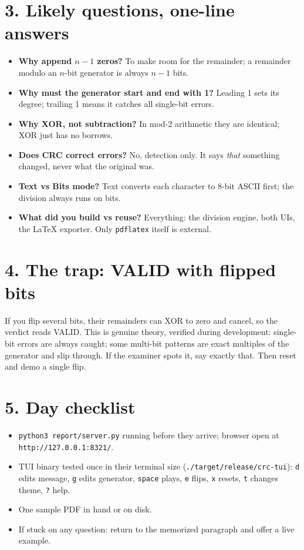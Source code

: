 \documentclass[11pt,a4paper]{article}
\begin{document}
\section*{3. Likely questions, one-line answers}

\begin{itemize}[leftmargin=1.5em]
  \item \textbf{Why append $n-1$ zeros?} To make room for the remainder;
  a remainder modulo an $n$-bit generator is always $n-1$ bits.
  \item \textbf{Why must the generator start and end with 1?} Leading 1
  sets its degree; trailing 1 means it catches all single-bit errors.
  \item \textbf{Why XOR, not subtraction?} In mod-2 arithmetic they are
  identical; XOR just has no borrows.
  \item \textbf{Does CRC correct errors?} No, detection only. It says
  \textit{that} something changed, never what the original was.
  \item \textbf{Text vs Bits mode?} Text converts each character to
  8-bit ASCII first; the division always runs on bits.
  \item \textbf{What did you build vs reuse?} Everything: the division
  engine, both UIs, the LaTeX exporter. Only \texttt{pdflatex} itself
  is external.
\end{itemize}

\section*{4. The trap: VALID with flipped bits}

If you flip several bits, their remainders can XOR to zero and cancel,
so the verdict reads VALID. This is genuine theory, verified during
development: single-bit errors are always caught; some multi-bit
patterns are exact multiples of the generator and slip through. If the
examiner spots it, say exactly that. Then reset and demo a single flip.

\section*{5. Day checklist}

\begin{itemize}[leftmargin=1.5em]
  \item \texttt{python3 report/server.py} running before they arrive;
  browser open at \texttt{http://127.0.0.1:8321/}.
  \item TUI binary tested once in their terminal size
  (\texttt{./target/release/crc-tui}): \texttt{d} edits message,
  \texttt{g} edits generator, \texttt{space} plays, \texttt{e} flips,
  \texttt{x} resets, \texttt{t} changes theme, \texttt{?} help.
  \item One sample PDF in hand or on disk.
  \item If stuck on any question: return to the memorized paragraph
  and offer a live example.
\end{itemize}
\end{document}
